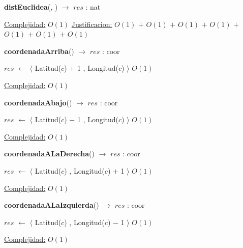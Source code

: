 \begin{Algoritmos}
\begin{algorithm}[H]{\textbf{distEuclidea}(, ) $\to$ $res$ : nat}
\begin{algorithmic}[1]
	\medskip
	\Statex \underline{Complejidad:} $O(1)$
	\Statex \underline{Justificacion:} $O(1)$ $+$ $O(1)$ $+$ $O(1)$ $+$ $O(1)$ $+$ $O(1)$ $+$ $O(1)$ $+$ $O(1)$
\end{algorithmic}
\end{algorithm}

\begin{algorithm}[H]{\textbf{coordenadaArriba}() $\to$ $res$ : coor}
\begin{algorithmic}[1]
	\State $res$ $\gets$  $\langle$ Latitud($c$) $+$ 1 , Longitud($c$) $\rangle$ \Comment $O(1)$

	\medskip
	\Statex \underline{Complejidad:} $O(1)$
\end{algorithmic}
\end{algorithm}


\begin{algorithm}[H]{\textbf{coordenadaAbajo}() $\to$ $res$ : coor}
\begin{algorithmic}[1]
	\State $res$ $\gets$  $\langle$ Latitud($c$) $-$ 1 , Longitud($c$) $\rangle$ \Comment $O(1)$

	\medskip
	\Statex \underline{Complejidad:} $O(1)$
\end{algorithmic}
\end{algorithm}

\begin{algorithm}[H]{\textbf{coordenadaALaDerecha}() $\to$ $res$ : coor}
\begin{algorithmic}[1]
	\State $res$ $\gets$  $\langle$ Latitud($c$) , Longitud($c$) $+$ 1 $\rangle$ \Comment $O(1)$

	\medskip
	\Statex \underline{Complejidad:} $O(1)$
\end{algorithmic}
\end{algorithm}

\begin{algorithm}[H]{\textbf{coordenadaALaIzquierda}() $\to$ $res$ : coor}
\begin{algorithmic}[1]
	\State $res$ $\gets$  $\langle$ Latitud($c$) , Longitud($c$) $-$ 1  $\rangle$ \Comment $O(1)$

	\medskip
	\Statex \underline{Complejidad:} $O(1)$
\end{algorithmic}
\end{algorithm}


\end{Algoritmos}